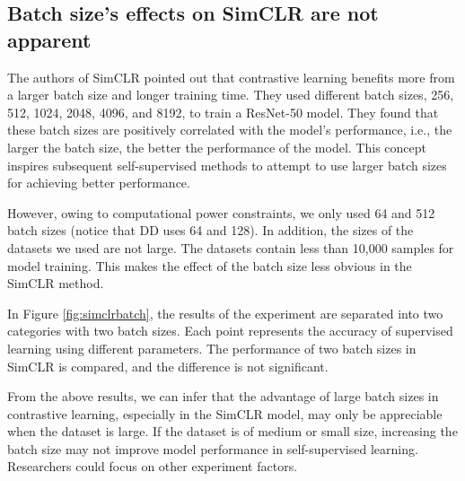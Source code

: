 \subsection{Batch size's effects on SimCLR are not apparent}

The authors of SimCLR \cite{SimCLR} pointed out that contrastive learning benefits more from a larger batch size and longer training time. They used different batch sizes, 256, 512, 1024, 2048, 4096, and 8192, to train a ResNet-50 model. They found that these batch sizes are positively correlated with the model's performance, i.e., the larger the batch size, the better the performance of the model. This concept inspires subsequent self-supervised methods to attempt to use larger batch sizes for achieving better performance. 


However, owing to computational power constraints, we only used 64 and 512 batch sizes (notice that DD uses 64 and 128). In addition, the sizes of the datasets we used are not large. The datasets contain less than 10,000 samples for model training. This makes the effect of the batch size less obvious in the SimCLR method. 


In Figure \ref{fig:simclrbatch}, the results of the experiment are separated into two categories with two batch sizes. Each point represents the accuracy of supervised learning using different parameters. The performance of two batch sizes in SimCLR is compared, and the difference is not significant.

From the above results, we can infer that the advantage of large batch sizes in contrastive learning, especially in the SimCLR model, may only be appreciable when the dataset is large. If the dataset is of medium or small size,  increasing the batch size may not improve model performance in self-supervised learning. Researchers could focus on other experiment factors.



